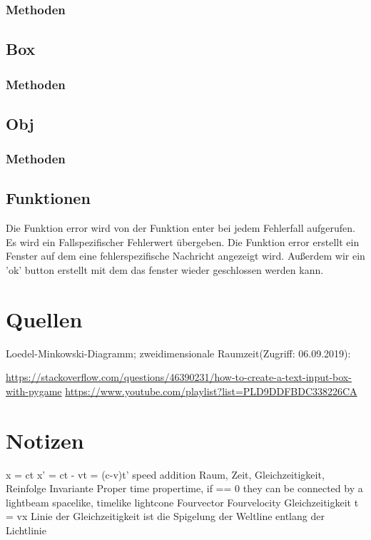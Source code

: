 \documentclass[12pt]{article}
\begin{document}
\subsubsection{Methoden}
\label{inputm}
\subsection{Box}
\subsubsection{Methoden}
\subsection{Obj}
\subsubsection{Methoden}
\subsection{Funktionen}
Die Funktion error wird von der Funktion enter bei jedem Fehlerfall aufgerufen.
Es wird ein Fallspezifischer Fehlerwert übergeben.
Die Funktion error erstellt ein Fenster auf dem eine fehlerspezifische Nachricht angezeigt wird.
Außerdem wir ein 'ok' button erstellt mit dem das fenster wieder geschlossen werden kann.
\section{Quellen}
Loedel-Minkowski-Diagramm; zweidimensionale Raumzeit(Zugriff: 06.09.2019):

\url{https://stackoverflow.com/questions/46390231/how-to-create-a-text-input-box-with-pygame}
\url{https://www.youtube.com/playlist?list=PLD9DDFBDC338226CA}
\section{Notizen}

x = ct
x' = ct - vt = (c-v)t'
speed addition
Raum, Zeit, Gleichzeitigkeit, Reinfolge
Invariante Proper time
propertime, if == 0 they can be connected by a lightbeam
spacelike, timelike
lightcone
Fourvector
Fourvelocity
Gleichzeitigkeit t = vx
Linie der Gleichzeitigkeit ist die Spigelung der Weltline entlang der Lichtlinie
\end{document}
